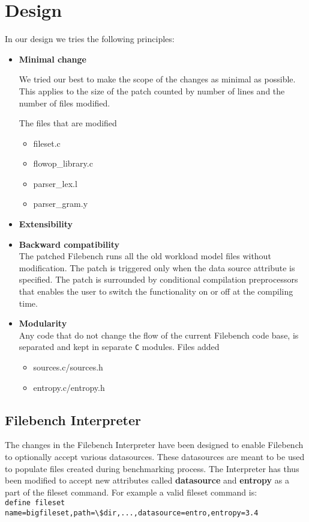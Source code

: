 \chapter{Design}\label{chap:des}

In our design we tries the following principles:

\begin{itemize}

\item \textbf{Minimal change} %

We tried our best to make the scope of the changes as minimal as possible. This applies to the size of the patch counted by number of lines 
and the number of files modified. 

The files that are modified
\begin{itemize}
\item fileset.c
\item flowop\_library.c
\item parser\_lex.l
\item parser\_gram.y
\end{itemize} 

\item \textbf{Extensibility} \\

\item \textbf{Backward compatibility} \\
The patched Filebench runs all the old workload model files without modification. The patch is triggered only when the data source attribute is specified. The patch is surrounded by conditional compilation preprocessors that enables the user to switch the functionality on or off at the compiling time.

\item \textbf{Modularity}\\
Any code that do not change the flow of the current Filebench code base, is separated and kept in separate \verb+C+ modules.
 Files added
\begin{itemize}
\item sources.c/sources.h 
\item entropy.c/entropy.h
\end{itemize}

\end{itemize}



\section{Filebench Interpreter}
The changes in the Filebench Interpreter have been designed to enable Filebench to optionally accept various datasources. These datasources are meant to be used to populate files created during benchmarking process. The Interpreter has thus been modified to accept new attributes called \textbf{datasource} and \textbf{entropy} as a part of the fileset command. For example a valid fileset command is:\\
\indent \verb+define fileset name=bigfileset,path=\$dir,...,datasource=entro,entropy=3.4+

